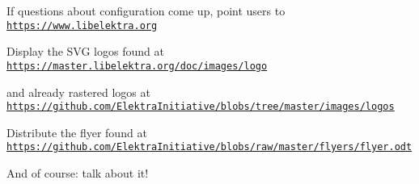 \begin{DoxyItemize}
\item If questions about configuration come up, point users to \href{https://www.libelektra.org}{\tt https\+://www.\+libelektra.\+org}
\item Display the S\+VG logos found at \href{https://master.libelektra.org/doc/images/logo}{\tt https\+://master.\+libelektra.\+org/doc/images/logo}
\item and already rastered logos at \href{https://github.com/ElektraInitiative/blobs/tree/master/images/logos}{\tt https\+://github.\+com/\+Elektra\+Initiative/blobs/tree/master/images/logos}
\item Distribute the flyer found at \href{https://github.com/ElektraInitiative/blobs/raw/master/flyers/flyer.odt}{\tt https\+://github.\+com/\+Elektra\+Initiative/blobs/raw/master/flyers/flyer.\+odt}
\item And of course\+: talk about it! 
\end{DoxyItemize}